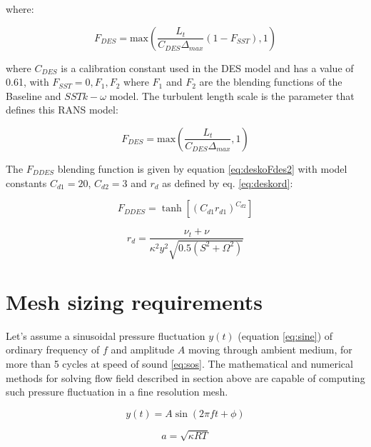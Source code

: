\noindent where:

\begin{equation} \label{eq:deskoFdes}
F_{DES} = \text{max}\left( \frac{L_t}{C_{DES} \Delta_{max}}\left( 1-F_{SST} \right), 1 \right)
\end{equation}

\noindent where $C_{DES}$ is a calibration constant used in the DES model and has a value of 0.61, with $F_{SST} = 0, F_1, F_2$ where $F_1$ and $F_2$ are the blending functions of  the Baseline and $SST k-\omega$ model. The turbulent length scale is the parameter that defines this RANS model:

\begin{equation} \label{eq:deskoFdes2}
F_{DES} = \text{max}\left( \frac{L_t}{C_{DES} \Delta_{max}}, 1 \right)
\end{equation}

The $F_{DDES}$ blending function is given by equation \ref{eq:deskoFdes2} with model constants $C_{d1} = 20$, $C_{d2} = 3$ and $r_d$ as defined by eq. \ref{eq:deskord}:

\begin{equation} \label{eq:deskoFddes}
F_{DDES} = \tanh \left[ \left( C_{d1} r_{d1} \right)^{C_{d2}} \right]
\end{equation}

\begin{equation} \label{eq:deskord}
r_d = \frac{\nu_t + \nu}{\kappa^2 y^2 \sqrt{0.5 \left( S^2 + \Omega^2 \right)}}
\end{equation}

\section{Mesh sizing requirements} \label{meshsize}
Let's assume a sinusoidal pressure fluctuation $y(t)$ (equation \ref{eq:sine}) of ordinary frequency of $f$ and amplitude $A$ moving through ambient medium, for more than 5 cycles at speed of sound \ref{eq:sos}. The mathematical and numerical methods for solving flow field described in section above are capable of computing such pressure fluctuation in a fine resolution mesh. 

\begin{equation} \label{eq:sine}
y(t) = A \sin(2 \pi f t + \phi)
\end{equation}

\begin{equation} \label{eq:sos}
a = \sqrt{\kappa R T}
\end{equation}

